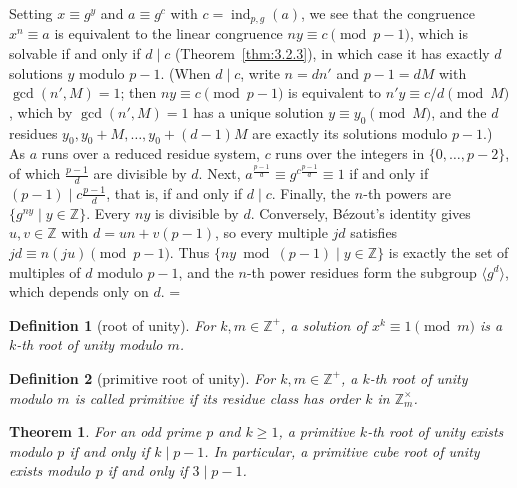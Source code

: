 \documentclass[11pt]{article}
\makeatletter
\theoremstyle{ntstyle}
\newtheorem{theorem}{Theorem}[subsection]
\newtheorem{definition}{Definition}[subsection]
\let\nt@closedisplay\]
\def\nt@guardedclose{\@ifnextchar\par{\nt@closeafterpar}{\@ifnextchar\end{\postdisplaypenalty\@M\nt@closedisplay}{\nt@closedisplay}}}
\def\nt@closeafterpar\par{\@ifnextchar\par{\nt@closeafterpar}{\@ifnextchar\end{\postdisplaypenalty\@M\nt@closedisplay\par}{\nt@closedisplay\par}}}
\renewenvironment{proof}[1][\proofname]{\par
  \pushQED{\qed}\normalfont\topsep\medskipamount\edef\nt@afterproof{\@endparpenalty=\the\@endparpenalty\relax}\@beginparpenalty\@M\@endparpenalty\@M\let\]\nt@guardedclose\trivlist\item[]\textit{#1\@addpunct{.}} \ignorespaces}{\ifvmode\addpenalty\@M\fi\popQED\nt@afterproof\endtrivlist\@endpefalse}
\newcommand{\ZmodUnits}[1]{\mathbb{Z}_{#1}^{\times}}
\DeclareMathOperator{\ind}{ind}
\makeatother
\begin{document}
\begin{proof} Setting $x \equiv g^{y}$ and $a \equiv
		g^{c}$ with $c = \ind_{p,g}(a)$, we see that the congruence $x^{n}
		\equiv a$ is equivalent to the linear congruence $ny \equiv c
		\pmod{p-1}$, which is solvable if and only if $d \mid c$ (Theorem~\ref{thm:3.2.3}), in which case it has exactly
	$d$ solutions $y$ modulo $p-1$. (When $d \mid c$, write
		$n = d n'$ and $p - 1 = d M$ with $\gcd(n', M) = 1$; then $ny \equiv
		c \pmod{p-1}$ is equivalent to $n' y \equiv c/d \pmod{M}$, which by
	$\gcd(n', M) = 1$ has a unique solution $y \equiv y_0 \pmod{M}$, and
	the $d$ residues $y_0, y_0 + M, \ldots, y_0 + (d-1)M$ are
	exactly its solutions modulo $p-1$.) As $a$ runs over a reduced
	residue system, $c$ runs over the integers in $\{0, \ldots, p-2\}$, of which
	$\frac{p-1}{d}$ are divisible by $d$. Next, $a^{\frac{p-1}{d}}
		\equiv g^{c\frac{p-1}{d}} \equiv 1$ if and only if $(p-1) \mid c\tfrac{p-1}{d}$,
		that is, if and only if $d \mid c$. Finally, the $n$-th powers are
	$\{g^{ny} \mid y \in \mathbb{Z}\}$. Every $ny$ is divisible by $d$.
	Conversely, B{\'e}zout's identity gives $u,v\in\mathbb{Z}$ with
	$d=un+v(p-1)$, so every multiple $jd$ satisfies
	$jd\equiv n(ju)\pmod{p-1}$. Thus $\{ny\bmod(p-1) \mid y\in\mathbb{Z}\}$
	is exactly the set of multiples of $d$ modulo $p-1$, and the $n$-th
	power residues form the subgroup $\langle g^{d}\rangle$, which depends
	only on $d$.
\end{proof}
\begin{definition}[root of unity]\label{def:7.7.3}
	For $k,m\in\mathbb{Z}^+$, a solution of $x^k\equiv1\pmod{m}$ is a $k$-th root of unity modulo
	$m$.
\end{definition}
\begin{definition}[primitive root of unity]\label{def:7.7.4}
	For $k,m\in\mathbb{Z}^+$, a $k$-th root of unity modulo $m$ is called primitive if its residue
	class has order $k$ in $\ZmodUnits{m}$.
\end{definition}
\begin{theorem}\label{thm:7.7.2} For
	an odd prime $p$ and $k \ge 1$, a primitive $k$-th root of unity
	exists modulo $p$ if and only if $k \mid p - 1$. In particular, a primitive cube
	root of unity exists modulo $p$ if and only if $3 \mid p - 1$.
\end{theorem}
\end{document}
